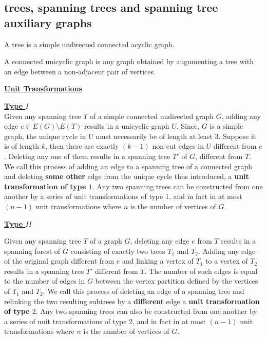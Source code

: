 \documentclass{llncs}
\begin{document}
\subsection{trees, spanning trees and spanning tree auxiliary graphs}
\begin{definition}
	A tree is a simple undirected connected acyclic graph.
\end{definition} 
\begin{definition}
	A connected unicyclic graph is any graph obtained by augumenting a tree with an edge between a non-adjacent pair of vertices.
\end{definition}
\begin{flushleft}
	{\bf \underline{Unit Transformations}}\\
\end{flushleft}
{\bf \underline{Type $I$}}\\
Given any spanning tree $T$ of a simple connected undirected graph $G$, adding any edge $e\in E(G)\setminus E(T)$ results in a unicyclic graph $U$. Since, $G$ is a simple graph, the unique cycle in $U$   must necessarily be of length at least 3. Suppose it is of length $k$, then there are exactly $(k-1)$ non-cut edges in $U$ different from $e$. Deleting any one of them results in a spanning tree $T'$ of $G$, different from $T$. We call this process of adding an edge to a spanning tree of a connected graph and deleting {\bf some other} edge from the unique cycle thus introduced, a {\bf unit transformation of type $1$}. Any two spanning trees can be constructed from one another by a series of unit transformations of type 1, and in fact in at most $(n-1)$ unit transformations where $n$ is the number of vertices of $G$. 
\begin{flushleft}
	{\bf \underline{Type $II$}}\\
\end{flushleft}
Given any spanning tree $T$ of a graph $G$, deleting any edge $e$ from $T$ results in a spanning forest of $G$ consisting of exactly two trees $T_1$ and $T_2$. Adding any edge of the original graph different from $e$ and linking a vertex of $T_1$ to a vertex of $T_2$ results in a spanning tree $T'$ different from $T$. The number of such edges is equal to the number of edges in $G$ between the vertex partition defined by the vertices of $T_1$ and $T_2$. We call this process of deleting an edge of a spanning tree and relinking the two resulting subtrees by a {\bf different} edge a {\bf unit transformation of type $2$}. Any two spanning trees can also be constructed from one another by a series of unit transformations of type 2, and in fact in at most $(n-1)$ unit transformations where $n$ is the number of vertices of $G$. 
\end{document}
